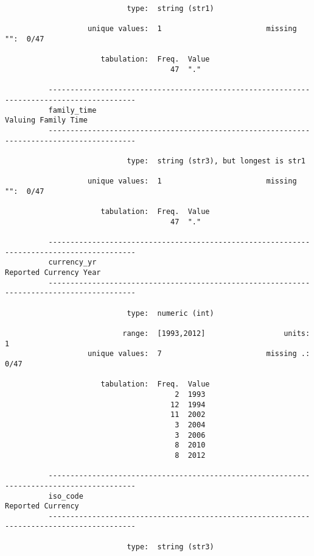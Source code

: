 \documentclass{article}
\begin{document}
\begin{verbatim}
                            type:  string (str1)
          
                   unique values:  1                        missing "":  0/47
          
                      tabulation:  Freq.  Value
                                      47  "."
          
          ------------------------------------------------------------------------------------------
          family_time                                                            Valuing Family Time
          ------------------------------------------------------------------------------------------
          
                            type:  string (str3), but longest is str1
          
                   unique values:  1                        missing "":  0/47
          
                      tabulation:  Freq.  Value
                                      47  "."
          
          ------------------------------------------------------------------------------------------
          currency_yr                                                         Reported Currency Year
          ------------------------------------------------------------------------------------------
          
                            type:  numeric (int)
          
                           range:  [1993,2012]                  units:  1
                   unique values:  7                        missing .:  0/47
          
                      tabulation:  Freq.  Value
                                       2  1993
                                      12  1994
                                      11  2002
                                       3  2004
                                       3  2006
                                       8  2010
                                       8  2012
          
          ------------------------------------------------------------------------------------------
          iso_code                                                                 Reported Currency
          ------------------------------------------------------------------------------------------
          
                            type:  string (str3)
          

\end{verbatim}
\end{document}
